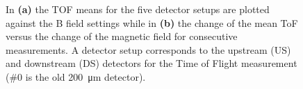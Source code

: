 \begin{refsection}
        \begin{figure}
            \centering
            \hfill
            \caption[muEDM 2023: TOF and magnetic hysteresis]{In \textbf{(a)} the TOF means for the five detector setups are plotted against the B field settings while in \textbf{(b)} the change of the mean ToF versus the change of the magnetic field for consecutive measurements. A detector setup corresponds to the upstream (US) and downstream (DS) detectors for the Time of Flight measurement (\#0 is the old \SI{200}{\micro\meter} detector).}
        \end{figure}


\end{refsection}
